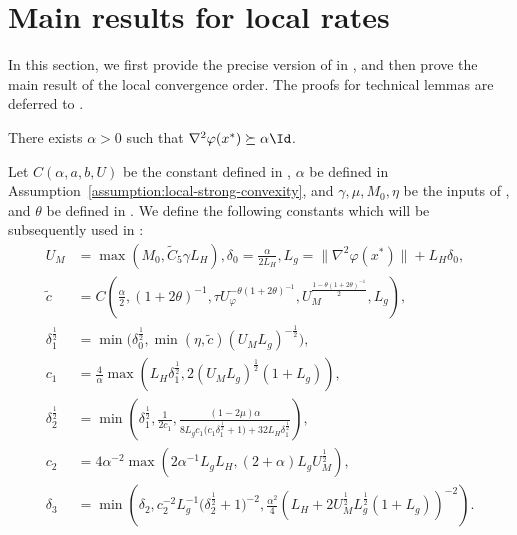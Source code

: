 \section{Main results for local rates}


In this section, we first provide the precise version of  in , and then prove the main result of the local convergence order. The proofs for technical lemmas are deferred to .

\begin{assumption}
    \label{assumption:local-strong-convexity}
    There exists $\alpha > 0$ such that $\nabla^2 \varphi(x^*) \succeq \alpha \Id$.
\end{assumption}


Let $C(\alpha, a, b, U)$ be the constant defined in ,
$\alpha$ be defined in Assumption~\ref{assumption:local-strong-convexity}, 
and $\gamma, \mu, M_0, \eta$ be the inputs of ,
and $\theta$ be defined in .
We define the following constants which will be subsequently used in :
\begin{align*}
    U_M &= \max(M_0, \tilde C_5 \gamma L_H), 
    \delta_0 = \frac{\alpha}{2L_H}, 
    L_g = \| \nabla^2 \varphi(x^*) \| + L_H \delta_0,   \\
    \tilde c &= 
    C\left (\frac{\alpha}{2},
    (1 + 2\theta)^{-1},
    \tau U_\varphi^{-\theta(1 + 2\theta)^{-1}},
    U_M^{\frac{1 - \theta(1 + 2\theta)^{-1}}{2}},
    L_g
    \right ),
    \\
    \delta_1^{\frac{1}{2}} &= \min \Big ( 
        \delta_0^{\frac{1}{2}}, 
        \min(\eta, \tilde c) (U_ML_g)^{-\frac{1}{2}}
    \Big ), \\
    c_1 &= \frac{4}{\alpha} \max \left ( 
        L_H \delta_1^{\frac{1}{2}},
        2(U_M L_g)^{\frac{1}{2}}(1 + L_g) 
        \right ), \\
    \delta_2^{\frac{1}{2}} &= \min\left ( 
        \delta_1^{\frac{1}{2}},
        \frac{1}{2c_1},
        \frac{(1 - 2\mu) \alpha}{
            8L_g c_1\big(c_1 \delta_1^{\frac{1}{2}} + 1 \big) 
            + 32L_H \delta_1^{\frac{1}{2}}
            } 
        \right ), \\
    c_2 &=
    4\alpha^{-2} \max\left( 
        2\alpha^{-1}L_gL_H,
        (2 + \alpha)L_gU_M^{\frac{1}{2}}
     \right), \\
    \delta_3 &= 
    \min\left( \delta_2, 
    c_2^{-2} L_g^{-1} \big ( \delta_2^{\frac{1}{2}} + 1 \big )^{-2},
    \frac{\alpha^2}{4} (L_H + 2U_M^{\frac{1}{2}}L_g^{\frac{1}{2}}(1 + L_g))^{-2}
     \right)
    .
\end{align*}

